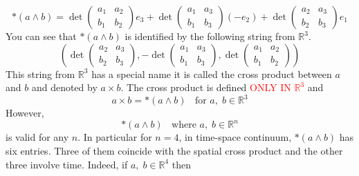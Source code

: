 \documentclass[color=black,11pt]{elegantpaper}
\begin{document}
$$
\ast(a \wedge b)=\det\left( \begin{array}{cc}
                                       a_1 & a_2 \\
                                       b_1 & b_2
                                   \end{array}\right) e_3 +
             \det\left( \begin{array}{cc}
                                       a_1 & a_3 \\
                                       b_1 & b_3
                                   \end{array}\right)(-e_2) +
             \det\left( \begin{array}{cc}
                                       a_2 & a_3 \\
                                       b_2 & b_3
                                   \end{array}\right) e_1
$$
You can see that $\ast(a \wedge b)$ is identified by the following string from  $\mathbb{R}^3.$
$$
\left( \det\left( \begin{array}{cc}
                                       a_2 & a_3 \\
                                       b_2 & b_3
                                   \end{array}\right) , - \det\left( \begin{array}{cc}
                                       a_1 & a_3 \\
                                       b_1 & b_3
                                   \end{array}\right),
                                   \det\left( \begin{array}{cc}
                                       a_1 & a_2 \\
                                       b_1 & b_2
                                   \end{array}\right)\right)
$$
This string from $\mathbb{R}^3$ has a special name it is called the cross product between $a$ and $b$ and denoted by $a \times b .$
The cross product is defined \textcolor{red}{ONLY IN $\mathbb{R}^3$} and
$$
a \times  b = \ast (a \wedge b)\;\;\mbox{ for } a,\; b\in \mathbb{R}^3
$$
 However, 
$$
 \ast (a \wedge b)\;\;\mbox{ where } a,\; b \in \mathbb{R}^n
$$
is valid for any $n.$ In particular for $n=4$, in time-space continuum,  $\ast (a \wedge b)$ has six entries. Three of them coincide with the spatial cross product and the other three involve time. Indeed, if $a,\; b\in \mathbb{R}^4$ then
\end{document}
